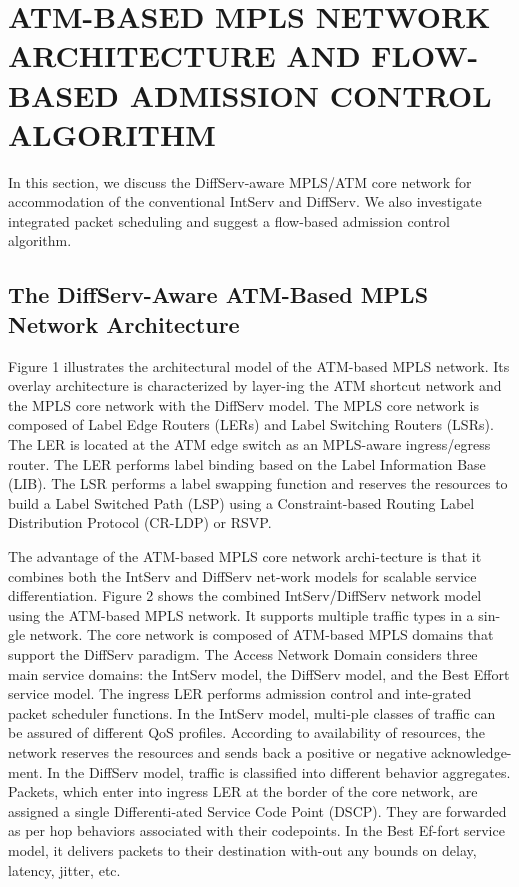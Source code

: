 \documentclass[10pt, twocolumn, twoside]{etri}
\begin{document}
\section{ATM-BASED MPLS NETWORK ARCHITECTURE AND
	FLOW-BASED ADMISSION CONTROL ALGORITHM}

In this section, we discuss the DiffServ-aware MPLS/ATM core network
for accommodation of the conventional IntServ and DiffServ. We also
investigate integrated packet scheduling and suggest a flow-based
admission control algorithm.

\subsection{The DiffServ-Aware ATM-Based MPLS Network Architecture}

Figure 1 illustrates the architectural model of the ATM-based MPLS
network. Its overlay architecture is characterized by layer-ing the ATM
shortcut network and the MPLS core network with the DiffServ model. The
MPLS core network is composed of Label Edge Routers (LERs) and Label
Switching Routers (LSRs). The LER is located at the ATM edge switch as an
MPLS-aware ingress/egress router. The LER performs label binding based
on the Label Information Base (LIB). The LSR performs a label swapping
function and reserves the resources to build a Label Switched Path (LSP)
using a Constraint-based Routing Label Distribution Protocol (CR-LDP)
or RSVP.

The advantage of the ATM-based MPLS core network archi-tecture is that
it combines both the IntServ and DiffServ net-work models for scalable
service differentiation. Figure 2 shows the combined IntServ/DiffServ
network model using the ATM-based MPLS network. It supports multiple
traffic types in a sin-gle network. The core network is composed of
ATM-based MPLS domains that support the DiffServ paradigm. The Access
Network Domain considers three main service domains: the IntServ model,
the DiffServ model, and the Best Effort service model. The ingress LER
performs admission control and inte-grated packet scheduler functions. In
the IntServ model, multi-ple classes of traffic can be assured of
different QoS profiles. According to availability of resources, the
network reserves the resources and sends back a positive or negative
acknowledge-ment. In the DiffServ model, traffic is classified into
different behavior aggregates. Packets, which enter into ingress LER at
the border of the core network, are assigned a single Differenti-ated
Service Code Point (DSCP). They are forwarded as per hop behaviors
associated with their codepoints. In the Best Ef-fort service model,
it delivers packets to their destination with-out any bounds on delay,
latency, jitter, etc.
\end{document}
